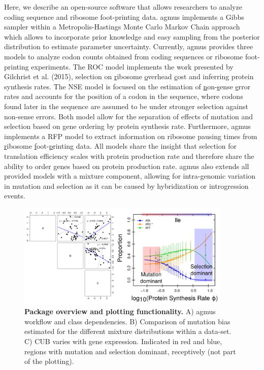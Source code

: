 \documentclass{bioinfo}
\newcommand{\package}{agmus } %
\begin{document}
Here, we describe an open-source software that allows researchers to analyze coding sequence and ribosome foot-printing data. 
\package implements a Gibbs sampler within a Metropolis-Hastings Monte Carlo Markov Chain approach which allows to incorporate prior knowledge and easy sampling from the posterior distribution to estimate parameter uncertainty. 
Currently, \package provides three models to analyze codon counts obtained from coding sequences or ribosome foot-printing experiments. 
The ROC model implements the work presented by Gilchrist et al. (2015), selection on \underline{r}ibosome \underline{o}verhead \underline{c}ost and inferring protein synthesis rates.
The NSE model is focused on the estimation of \underline{n}on-\underline{s}ense \underline{e}rror rates and accounts for the position of a codon in the sequence, where codons found later in the sequence are assumed to be under stronger selection against non-sense errors.
Both model allow for the separation of effects of mutation and selection based on gene ordering by protein synthesis rate.
Furthermore, \package implements a RFP model to extract information on ribosome pausing times from \underline{r}ibosome \underline{f}oot-\underline{p}rinting data. 
All models share the insight that selection for translation efficiency scales with protein production rate and therefore share the ability to order genes based on protein production rate. 
\package also extends all provided models with a mixture component, allowing for intra-genomic variation in mutation and selection as it can be caused by hybridization or introgression events.

\begin{figure}[!tpb]
\centering
 \includegraphics[width=4in]{comb_plots.png}
\vspace{-0.2cm}
\caption{\textbf{Package overview and plotting functionality.} A) \package workflow and class dependencies. B) Comparison of mutation bias estimated for the different mixture distributions within a data-set. C) CUB varies with gene expression. Indicated in red and blue, regions with mutation and selection dominant, receptively (not part of the plotting). 
}
\label{fig:plotbin}
\end{figure}
\end{document}
